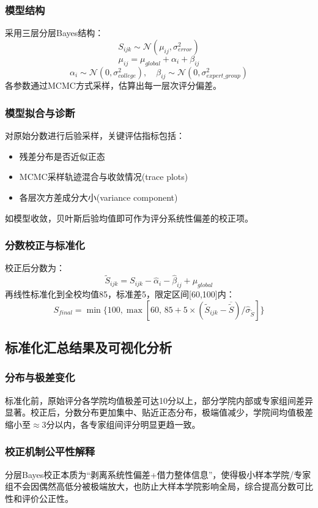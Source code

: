 \subsubsection{模型结构}
采用三层分层Bayes结构：
\[
S_{ijk} \sim \mathcal{N}(\mu_{ij}, \sigma_{error}^2)
\]
\[
\mu_{ij} = \mu_{global} + \alpha_i + \beta_{ij}
\]
\[
\alpha_{i} \sim \mathcal{N}(0, \sigma_{college}^2), \quad \beta_{ij} \sim \mathcal{N}(0, \sigma_{expert\_group}^2)
\]
各参数通过MCMC方式采样，估算出每一层次评分偏差。

\subsubsection{模型拟合与诊断}
对原始分数进行后验采样，关键评估指标包括：
\begin{itemize}
    \item 残差分布是否近似正态
    \item MCMC采样轨迹混合与收敛情况(trace plots)
    \item 各层次方差成分大小(variance component)
\end{itemize}

如模型收敛，贝叶斯后验均值即可作为评分系统性偏差的校正项。

\subsubsection{分数校正与标准化}
校正后分数为：
\[
\widetilde{S}_{ijk} = S_{ijk} - \hat{\alpha}_i - \hat{\beta}_{ij} + \mu_{global}
\]
再线性标准化到全校均值85，标准差5，限定区间[60,100]内：
\[
S_{final} = \min\{100, \max[60,\, 85 + 5\times(\widetilde{S}_{ijk}-\overline{\widetilde{S}})/\widehat{\sigma}_{\widetilde{S}}]\}
\]

\subsection{标准化汇总结果及可视化分析}
\subsubsection{分布与极差变化}
标准化前，原始评分各学院均值极差可达10分以上，部分学院内部或专家组间差异显著。校正后，分数分布更加集中、贴近正态分布，极端值减少，学院间均值极差缩小至$\approx 3$分以内，各专家组间评分明显更趋一致。

\subsubsection{校正机制公平性解释}
分层Bayes校正本质为“剥离系统性偏差+借力整体信息”，使得极小样本学院/专家组不会因偶然高低分被极端放大，也防止大样本学院影响全局，综合提高分数可比性和评价公正性。

